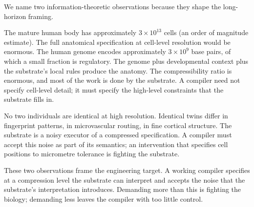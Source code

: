 We name two information-theoretic observations because they shape the
long-horizon framing.

 The mature human
body has approximately $3\times 10^{13}$ cells (an order of magnitude
estimate). The full anatomical specification at cell-level resolution
would be enormous. The human genome encodes approximately $3\times
10^9$ base pairs, of which a small fraction is regulatory. The genome
plus developmental context plus the substrate's local rules produce
the anatomy. The compressibility ratio is enormous, and most of the
work is done by the substrate. A compiler need not specify cell-level
detail; it must specify the high-level constraints that the substrate
fills in.

 No two individuals are
identical at high resolution. Identical twins differ in fingerprint
patterns, in microvascular routing, in fine cortical structure. The
substrate is a noisy executor of a compressed specification. A
compiler must accept this noise as part of its semantics; an
intervention that specifies cell positions to micrometre tolerance is
fighting the substrate.

These two observations frame the engineering target. A working compiler
specifies at a compression level the substrate can interpret and
accepts the noise that the substrate's interpretation introduces.
Demanding more than this is fighting the biology; demanding less leaves
the compiler with too little control.

